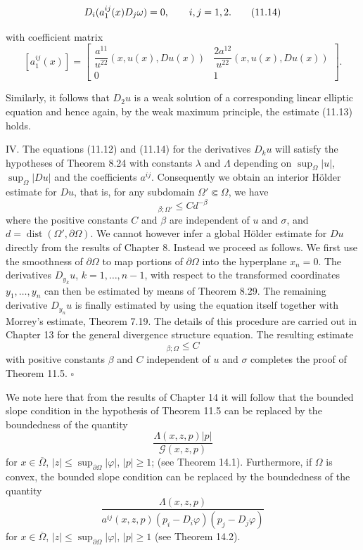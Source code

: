\begin{equation}
D_i(a^{ij}_1(x)D_j\omega)=0, \qquad i,j=1,2.
\tag{11.14}
\end{equation}



\pagestyle{empty}


with coefficient matrix
\[
[a^{ij}_1(x)] =
\begin{bmatrix}
\dfrac{a^{11}}{u^{22}}(x, u(x), Du(x)) &
\dfrac{2a^{12}}{u^{22}}(x, u(x), Du(x)) \\
0 & 1
\end{bmatrix}.
\]

Similarly, it follows that $D_2u$ is a weak solution of a corresponding linear elliptic equation and hence again, by the weak maximum principle, the estimate (11.13) holds.

IV. The equations (11.12) and (11.14) for the derivatives $D_k u$ will satisfy the hypotheses of Theorem 8.24 with constants $\lambda$ and $\Lambda$ depending on $\sup_{\Omega}|u|$, $\sup_{\Omega}|Du|$ and the coefficients $a^{ij}$. Consequently we obtain an interior H\"older estimate for $Du$, that is, for any subdomain $\Omega' \Subset \Omega$, we have
\begin{equation}
[Du]_{\beta;\Omega'} \le C d^{-\beta}
\tag{11.15}
\end{equation}
where the positive constants $C$ and $\beta$ are independent of $u$ and $\sigma$, and $d=\operatorname{dist}(\Omega',\partial\Omega)$. We cannot however infer a global H\"older estimate for $Du$ directly from the results of Chapter 8. Instead we proceed as follows. We first use the smoothness of $\partial\Omega$ to map portions of $\partial\Omega$ into the hyperplane $x_n=0$. The derivatives $D_{y_k}u$, $k=1,\ldots,n-1$, with respect to the transformed coordinates $y_1,\ldots,y_n$ can then be estimated by means of Theorem 8.29. The remaining derivative $D_{y_n}u$ is finally estimated by using the equation itself together with Morrey's estimate, Theorem 7.19. The details of this procedure are carried out in Chapter 13 for the general divergence structure equation. The resulting estimate
\begin{equation}
[Du]_{\beta;\Omega} \le C
\tag{11.16}
\end{equation}
with positive constants $\beta$ and $C$ independent of $u$ and $\sigma$ completes the proof of Theorem 11.5. $\square$

We note here that from the results of Chapter 14 it will follow that the bounded slope condition in the hypothesis of Theorem 11.5 can be replaced by the boundedness of the quantity
\[
\frac{\Lambda(x,z,p)|p|}{\mathcal{G}(x,z,p)}
\]
for $x \in \overline{\Omega}$, $|z| \le \sup_{\partial\Omega} |\varphi|$, $|p| \ge 1$; (see Theorem 14.1). Furthermore, if $\Omega$ is convex, the bounded slope condition can be replaced by the boundedness of the quantity
\[
\frac{\Lambda(x,z,p)}{a^{ij}(x,z,p)(p_i - D_i\varphi)(p_j - D_j\varphi)}
\]
for $x \in \overline{\Omega}$, $|z| \le \sup_{\partial\Omega} |\varphi|$, $|p| \ge 1$ (see Theorem 14.2).


